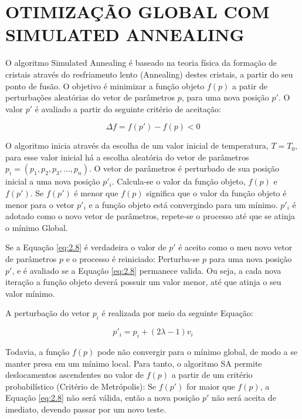\chapter{OTIMIZAÇÃO GLOBAL COM SIMULATED ANNEALING}
\label{cap2}


O algoritmo Simulated Annealing é baseado na teoria física da formação de cristais
através do resfriamento lento (Annealing) destes cristais, a partir do seu ponto de fusão.
O objetivo é minimizar a função objeto $f(p)$ a patir de perturbações aleatórias do vetor de parâmetros $p$,
para uma nova posição $p'$. O valor $p'$ é avaliado a partir do seguinte critério de aceitação:

\begin{equation}
\label{eq:2.8}
 \Delta f=f(p')-f(p) < 0
\end{equation}

O algoritmo inicia através da escolha de um valor inicial de temperatura, $T=T_0$, para esse valor inicial há
a escolha aleatória do vetor de parâmetros $p_i=(p_1,p_2,p_3,...,p_n)$. O vetor de parâmetros é perturbado 
de sua posição inicial a uma nova posição $p'_i$. Calcula-se o valor da função objeto, $f(p)$ e $f(p')$. Se $f(p')$ é
menor que $f(p)$ significa que o valor da função objeto é menor para o vetor $p'_i$
e a função objeto está convergindo para um mínimo. $p'_i$ é adotado como o
novo vetor de parâmetros, repete-se o processo até que se atinja o mínimo Global.

Se a Equação \ref{eq:2.8} é verdadeira o valor de $p'$ é aceito como o meu novo vetor de parâmetros $p$ e o processo
é reiniciado: Perturba-se $p$ para uma nova posição $p'$, e é avaliado se a Equação \ref{eq:2.8} permanece valida. 
Ou seja, a cada nova
iteração a função objeto deverá possuir um valor menor, até que atinja o seu valor mínimo.

A perturbação do vetor $p_i$ é realizada por meio da seguinte Equação:

\begin{equation}
\label{eq:2.9}
 p'_i=p_i+(2\lambda-1)v_i
\end{equation}

Todavia, a função $f(p)$ pode não convergir para o mínimo global, de modo a se manter presa
em um mínimo local. Para tanto, o algoritmo SA permite deslocamentos ascendentes no valor de $f(p)$ a partir de um critério
probabilístico (Critério de Metrópolis): Se $f(p')$ for maior que $f(p)$, a Equação \ref{eq:2.8} não será válida, então
a nova posição $p'$ não será aceita de imediato, devendo passar por um novo teste.

